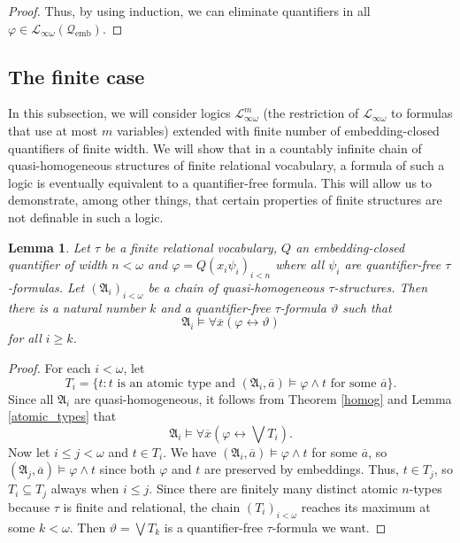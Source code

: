 \documentclass{ndjflart}
\theoremstyle{plain}
\newtheorem{lemma}[conjecture]{Lemma}
\theoremstyle{definition}
\numberwithin{equation}{section}
\DeclareMathOperator{\emb}{emb}
\begin{document}
\begin{proof}
Thus, by using induction, we can eliminate quantifiers in all $\varphi \in \mathcal{L}_{\infty\omega}(\mathcal{Q}_{\emb})$.
\end{proof}

\subsection{The finite case}

In this subsection, we will consider logics $\mathcal{L}_{\infty\omega}^m$ (the restriction of $\mathcal{L}_{\infty\omega}$ to formulas that use at most $m$ variables) extended with finite number of em\-bed\-ding-closed quantifiers of finite width.
We will show that in a countably infinite chain of quasi-homogeneous structures of finite relational vocabulary,
a formula of such a logic is eventually equivalent to a quantifier-free formula.
This will allow us to demonstrate, among other things, that certain properties of finite structures are not definable in such a logic. 



\begin{lemma}\label{quant_elim_finite_lemma}
Let $\tau$ be a finite relational vocabulary, 
$Q$ an embedding-closed quantifier of width $n<\omega$ and $\varphi = Q(x_i\psi_i)_{i<n}$ where all $\psi_i$ are quantifier-free $\tau$-formulas.
Let $(\mathfrak{A}_i)_{i<\omega}$ be a chain of quasi-homogeneous $\tau$-structures. 
Then there is a natural number $k$ and a quantifier-free $\tau$-formula $\vartheta$ such that
\[
	\mathfrak{A}_i \vDash \forall \overline{x}(\varphi \leftrightarrow \vartheta)
\]
for all $i \geq k$.
\end{lemma}
\begin{proof}
For each $i < \omega$, let 
\[
	T_i = \{t \colon t \text{ is an atomic type and } (\mathfrak{A}_i,\overline{a}) \vDash \varphi \wedge  t \text{ for some } \overline{a} \}.
\]
Since all $\mathfrak{A}_i$ are quasi-homogeneous, it follows from Theorem \ref{homog} and Lemma \ref{atomic_types} that 
\[
	\mathfrak{A}_i \vDash \forall \overline{x}(\varphi \leftrightarrow \bigvee T_i).
\]
Now let $i \leq j < \omega$ and $t \in T_i$. We have $(\mathfrak{A}_i,\overline{a}) \vDash \varphi \wedge t$ for some $\overline{a}$, so $(\mathfrak{A}_j,\overline{a}) \vDash \varphi \wedge t$ since both $\varphi$ and $t$ are preserved by embeddings. Thus, $t \in T_j$, so $T_i \subseteq T_j$ always when $i \leq j$.
Since there are finitely many distinct atomic $n$-types because $\tau$ is finite and relational, the chain $(T_i)_{i < \omega}$ reaches its maximum at some $k < \omega$. Then $\vartheta = \bigvee T_k$ is a quantifier-free $\tau$-formula we want.
\end{proof}
\end{document}
